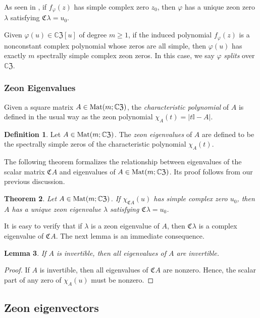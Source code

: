 \documentclass{article}
\newtheorem{theorem}{Theorem}[section]
\newtheorem{lemma}[theorem]{Lemma}
\theoremstyle{definition}
\newtheorem{definition}[theorem]{Definition}
\newcommand{\zco}{\mathfrak{C}\mspace{1mu}}
\newcommand{\CZ}{\mathbb{C}\mathfrak{Z}}
\newcommand{\Mat}{{\rm Mat}}
\newcommand{\mI}{\mathbb{I}}
\numberwithin{equation}{section}
\begin{document}
As seen in \cite{simplezeonzeros}, if $f_\varphi(z)$ has simple complex zero $z_0$, then $\varphi$ has a unique zeon zero $\lambda$ satisfying $\zco \lambda = u_0$.

Given $\varphi(u)\in\CZ[u]$ of degree $m\ge 1$, if the induced polynomial $f_\varphi(z)$ is a nonconstant complex polynomial whose zeros are all simple, then $\varphi(u)$ has exactly $m$ spectrally simple complex zeon zeros.  In this case, we say $\varphi$ {\em splits} over $\CZ$.

\subsubsection{Zeon Eigenvalues}

Given a square matrix $A\in \Mat(m;\CZ)$,  the {\em characteristic polynomial} of $A$ is defined in the usual way as the zeon polynomial $\chi_A(t)=|t\mI-A|$.   

\begin{definition}
Let $A\in \Mat(m;\CZ)$.  The {\em zeon eigenvalues} of $A$ are defined to be the spectrally simple zeros of the characteristic polynomial $\chi_A(t)$.  
\end{definition}

The following theorem formalizes the relationship between eigenvalues of the scalar matrix $\zco A$ and eigenvalues of $A\in\Mat(m;\CZ)$.  Its proof follows from our previous discussion.

\begin{theorem}
Let $A\in \Mat(m;\CZ)$.  If $\chi_{\zco A}(u)$ has simple complex zero $u_0$, then $A$ has a unique zeon eigenvalue $\lambda$ satisfying $\zco \lambda = u_0$.  
\end{theorem}

It is easy to verify that if $\lambda$ is a zeon eigenvalue of $A$, then $\zco \lambda$ is a complex eigenvalue of $\zco A$.  The next lemma is an immediate consequence.

\begin{lemma}
If $A$ is invertible, then all eigenvalues of $A$ are invertible.
\end{lemma}

\begin{proof}
If $A$ is invertible, then all eigenvalues of $\zco A$ are nonzero.  Hence, the scalar part of any zero of $\chi_A(u)$ must be nonzero.
\end{proof}


\subsection{Zeon eigenvectors}
\end{document}
